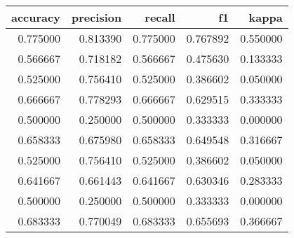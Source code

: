 \begin{tabular}{rrrrr}
\toprule
accuracy & precision & recall & f1 & kappa \\
\midrule
0.775000 & 0.813390 & 0.775000 & 0.767892 & 0.550000 \\
0.566667 & 0.718182 & 0.566667 & 0.475630 & 0.133333 \\
0.525000 & 0.756410 & 0.525000 & 0.386602 & 0.050000 \\
0.666667 & 0.778293 & 0.666667 & 0.629515 & 0.333333 \\
0.500000 & 0.250000 & 0.500000 & 0.333333 & 0.000000 \\
0.658333 & 0.675980 & 0.658333 & 0.649548 & 0.316667 \\
0.525000 & 0.756410 & 0.525000 & 0.386602 & 0.050000 \\
0.641667 & 0.661443 & 0.641667 & 0.630346 & 0.283333 \\
0.500000 & 0.250000 & 0.500000 & 0.333333 & 0.000000 \\
0.683333 & 0.770049 & 0.683333 & 0.655693 & 0.366667 \\
\bottomrule
\end{tabular}
